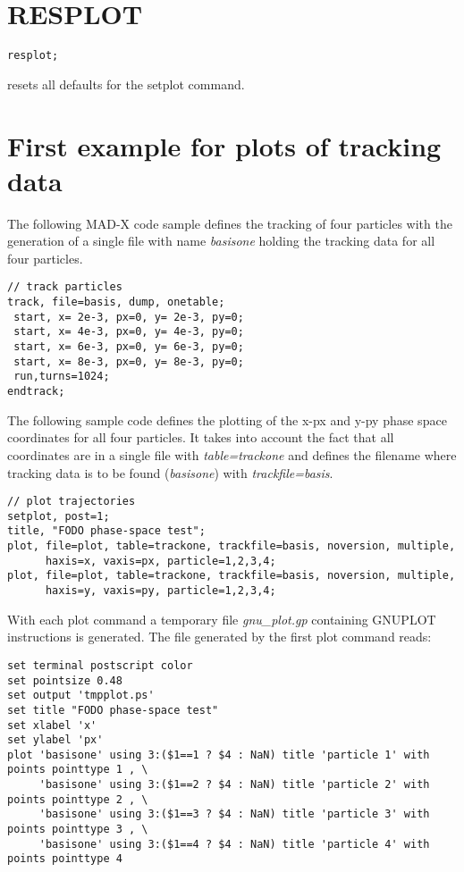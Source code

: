 \section{RESPLOT}
\begin{verbatim}
resplot; 
\end{verbatim} 
resets all defaults for the setplot command.  


\section{First example for plots of tracking data}

The following MAD-X code sample defines the tracking of four particles 
with the generation of a single file with name \textit{basisone} 
holding the tracking data for all four particles.  

\begin{verbatim}
// track particles
track, file=basis, dump, onetable;
 start, x= 2e-3, px=0, y= 2e-3, py=0;
 start, x= 4e-3, px=0, y= 4e-3, py=0;
 start, x= 6e-3, px=0, y= 6e-3, py=0;
 start, x= 8e-3, px=0, y= 8e-3, py=0;
 run,turns=1024;
endtrack;
\end{verbatim}

The following sample code defines the plotting of the x-px and y-py
phase space coordinates for all four particles. 
It takes into account the fact that all coordinates are in a single file 
with \textit{table=trackone} and defines the filename where tracking data 
is to be found (\textit{basisone}) with \textit{trackfile=basis}. 

\begin{verbatim}
// plot trajectories
setplot, post=1; 
title, "FODO phase-space test";
plot, file=plot, table=trackone, trackfile=basis, noversion, multiple, 
      haxis=x, vaxis=px, particle=1,2,3,4; 
plot, file=plot, table=trackone, trackfile=basis, noversion, multiple, 
      haxis=y, vaxis=py, particle=1,2,3,4;
\end{verbatim}

With each plot command a temporary file \textit{gnu\_plot.gp} containing
GNUPLOT instructions is generated.  
The file generated by the first plot command reads: 

\begin{verbatim}  
set terminal postscript color
set pointsize 0.48
set output 'tmpplot.ps'
set title "FODO phase-space test"
set xlabel 'x'
set ylabel 'px'
plot 'basisone' using 3:($1==1 ? $4 : NaN) title 'particle 1' with points pointtype 1 , \
     'basisone' using 3:($1==2 ? $4 : NaN) title 'particle 2' with points pointtype 2 , \
     'basisone' using 3:($1==3 ? $4 : NaN) title 'particle 3' with points pointtype 3 , \
     'basisone' using 3:($1==4 ? $4 : NaN) title 'particle 4' with points pointtype 4 
\end{verbatim}

